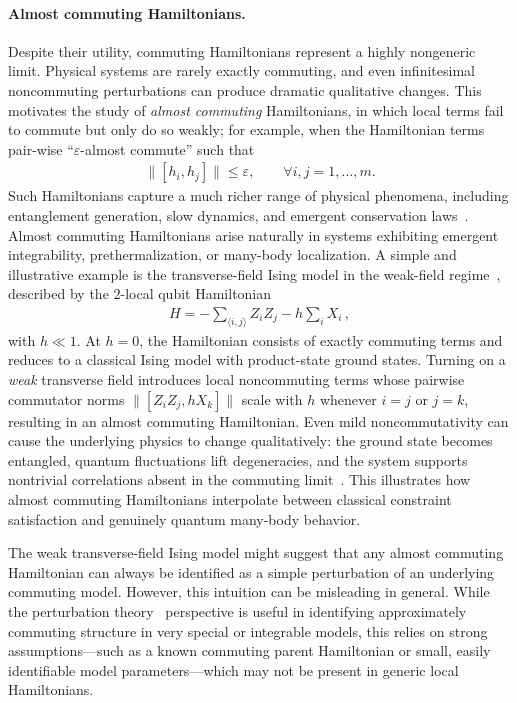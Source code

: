 \documentclass[11pt]{article}
\theoremstyle{plain}
\newcommand{\eps}{\varepsilon}
\begin{document}
\paragraph{Almost commuting Hamiltonians.}
Despite their utility, commuting Hamiltonians represent a highly nongeneric limit.  Physical systems are rarely exactly commuting, and even infinitesimal noncommuting perturbations can produce dramatic qualitative changes. 
 This motivates the study of \emph{almost commuting} Hamiltonians, in 
 which local terms fail to commute but only do so weakly; for example, when the Hamiltonian terms pair-wise ``$\eps$-almost commute'' such that
\begin{align}
\|[h_i,h_j]\| \leq \eps, \quad\quad \forall i,j=1,\dots,m.   
\end{align}
Such Hamiltonians capture a much richer range of physical phenomena, including 
entanglement generation, slow dynamics, and emergent conservation laws~\cite{Sachdev2011}. Almost 
 commuting Hamiltonians arise naturally in systems exhibiting emergent integrability, prethermalization, or many-body localization. 
A simple and illustrative example is the transverse-field Ising model 
in the weak-field regime~\cite{Sachdev2011}, described by the $2$-local qubit Hamiltonian
\begin{align}\label{eq:ising}
H = -\sum_{\langle i,j \rangle} Z_i Z_j - h \sum_i X_i \, ,
\end{align}
with $h \ll 1$.  At $h=0$, the Hamiltonian consists of exactly 
commuting terms and reduces to a classical Ising model with 
product-state ground states.  Turning on a \emph{weak} transverse field 
introduces local noncommuting terms whose pairwise commutator norms 
$\|[Z_i Z_j,hX_k]\|$
scale with $h$ whenever $i=j$ or $j=k$, resulting in an almost commuting Hamiltonian. Even
mild noncommutativity can cause the underlying physics to 
change qualitatively: the ground state becomes entangled, quantum fluctuations lift degeneracies, and the system supports nontrivial correlations absent in the commuting limit~\cite{Mbeng_2024}.  This illustrates how almost commuting Hamiltonians interpolate between classical constraint satisfaction and genuinely quantum many-body behavior.

The weak transverse-field Ising model might suggest that any almost commuting Hamiltonian can always be identified as a simple perturbation of an underlying commuting model. However, this intuition can be misleading in general. While the perturbation theory~\cite{Kato:1966:PTL} perspective is useful in identifying approximately commuting structure in very special or integrable models, this relies on strong assumptions---such as a known commuting parent Hamiltonian or small, easily identifiable model parameters---which may not be present in generic local Hamiltonians. 
\end{document}

